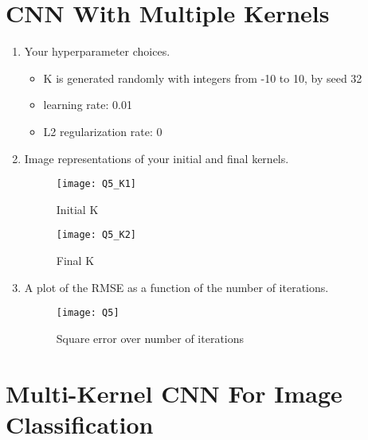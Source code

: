 \documentclass[12pt]{article}
\begin{document}
\section{CNN With Multiple Kernels}\label{MF}
\begin{enumerate}
\item Your hyperparameter choices.
\begin{itemize}
\item[]K is generated randomly with integers from -10 to 10, by seed 32
\item[]learning rate: 0.01
\item[]L2 regularization rate: 0
\end{itemize}

\item Image representations of your initial and final kernels.

\begin{figure}[H]
\centering
\texttt{[image: Q5\_K1]}
\caption{Initial K}
\end{figure} 

\begin{figure}[H]
\centering
\texttt{[image: Q5\_K2]}
\caption{Final K}
\end{figure} 

\item A plot of the RMSE as a function of the number of iterations.
\begin{figure}[H]
\centering
\texttt{[image: Q5]}
\caption{Square error over number of iterations}
\end{figure} 


\end{enumerate}
\newpage
\section{Multi-Kernel CNN For Image Classification}
\end{document}
